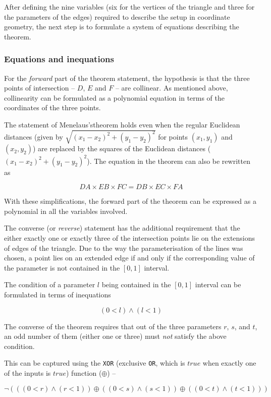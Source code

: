 \documentclass{amsart}
\theoremstyle{plain}
\theoremstyle{definition}
\theoremstyle{remark}
\begin{document}
After defining the nine variables (six for the vertices of the triangle and three for the parameters of the edges) required to describe the setup in coordinate geometry, the next step is to formulate a system of equations describing the theorem.

\subsubsection{Equations and inequations}

For the \emph{forward} part of the theorem statement, the hypothesis is that the three points of intersection -- \(D\), \(E\) and \(F\) -- are collinear. As mentioned above, collinearity can be formulated as a polynomial equation in terms of the coordinates of the three points.

The statement of Menelaus'stheorem holds even when the regular Euclidean distances (given by $\sqrt{(x_1 - x_2)^2 + (y_1 - y_2)^2}$ for points $(x_1, y_1)$ and $(x_2, y_2)$) are replaced by the squares of the Euclidean distances ($(x_1 - x_2)^2 + (y_1 - y_2)^2$). The equation in the theorem can also be rewritten as

$$
	DA \times EB \times FC = DB \times EC \times FA
$$

With these simplifications, the forward part of the theorem can be expressed as a polynomial in all the variables involved.

The converse (or \emph{reverse}) statement has the additional requirement that the either exactly one or exactly three of the intersection points lie on the extensions of edges of the triangle. Due to the way the parameterisation of the lines was chosen, a point lies on an extended edge if and only if the corresponding value of the parameter is not contained in the \(\left[0, 1\right]\) interval.

The condition of a parameter $l$ being contained in the \(\left[0, 1\right]\) interval can be formulated in terms of inequations

$$
	(0 < l) \wedge (l < 1)
$$

The converse of the theorem requires that out of the three parameters \(r\), \(s\), and \(t\), an odd number of them (either one or three) must \emph{not} satisfy the above condition.

This can be captured using the \texttt{XOR} (exclusive \texttt{OR}, which is $true$ when exactly one of the inputs is $true$) function ($\oplus$) --

$$
	\neg \left( \left( (0 < r) \wedge (r < 1) \right) \oplus \left( (0 < s) \wedge (s < 1) \right) \oplus \left( (0 < t) \wedge (t < 1) \right) \right)
$$
\end{document}
